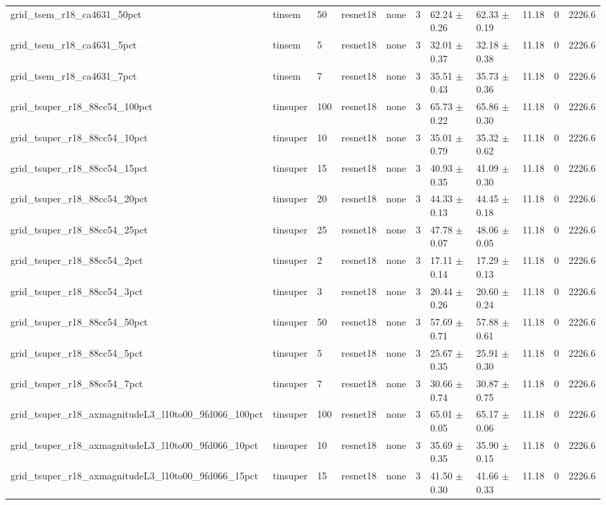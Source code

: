 \begin{tabular}{lllllllllll}
grid_tsem_r18_ca4631_50pct & tinsem & 50 & resnet18 & none & 3 & 62.24 $\pm$ 0.26 & 62.33 $\pm$ 0.19 & 11.18 & 0 & 2226.6 \\
grid_tsem_r18_ca4631_5pct & tinsem & 5 & resnet18 & none & 3 & 32.01 $\pm$ 0.37 & 32.18 $\pm$ 0.38 & 11.18 & 0 & 2226.6 \\
grid_tsem_r18_ca4631_7pct & tinsem & 7 & resnet18 & none & 3 & 35.51 $\pm$ 0.43 & 35.73 $\pm$ 0.36 & 11.18 & 0 & 2226.6 \\
grid_tsuper_r18_88cc54_100pct & tinsuper & 100 & resnet18 & none & 3 & 65.73 $\pm$ 0.22 & 65.86 $\pm$ 0.30 & 11.18 & 0 & 2226.6 \\
grid_tsuper_r18_88cc54_10pct & tinsuper & 10 & resnet18 & none & 3 & 35.01 $\pm$ 0.79 & 35.32 $\pm$ 0.62 & 11.18 & 0 & 2226.6 \\
grid_tsuper_r18_88cc54_15pct & tinsuper & 15 & resnet18 & none & 3 & 40.93 $\pm$ 0.35 & 41.09 $\pm$ 0.30 & 11.18 & 0 & 2226.6 \\
grid_tsuper_r18_88cc54_20pct & tinsuper & 20 & resnet18 & none & 3 & 44.33 $\pm$ 0.13 & 44.45 $\pm$ 0.18 & 11.18 & 0 & 2226.6 \\
grid_tsuper_r18_88cc54_25pct & tinsuper & 25 & resnet18 & none & 3 & 47.78 $\pm$ 0.07 & 48.06 $\pm$ 0.05 & 11.18 & 0 & 2226.6 \\
grid_tsuper_r18_88cc54_2pct & tinsuper & 2 & resnet18 & none & 3 & 17.11 $\pm$ 0.14 & 17.29 $\pm$ 0.13 & 11.18 & 0 & 2226.6 \\
grid_tsuper_r18_88cc54_3pct & tinsuper & 3 & resnet18 & none & 3 & 20.44 $\pm$ 0.26 & 20.60 $\pm$ 0.24 & 11.18 & 0 & 2226.6 \\
grid_tsuper_r18_88cc54_50pct & tinsuper & 50 & resnet18 & none & 3 & 57.69 $\pm$ 0.71 & 57.88 $\pm$ 0.61 & 11.18 & 0 & 2226.6 \\
grid_tsuper_r18_88cc54_5pct & tinsuper & 5 & resnet18 & none & 3 & 25.67 $\pm$ 0.35 & 25.91 $\pm$ 0.30 & 11.18 & 0 & 2226.6 \\
grid_tsuper_r18_88cc54_7pct & tinsuper & 7 & resnet18 & none & 3 & 30.66 $\pm$ 0.74 & 30.87 $\pm$ 0.75 & 11.18 & 0 & 2226.6 \\
grid_tsuper_r18_axmagnitudeL3_l10to00_9fd066_100pct & tinsuper & 100 & resnet18 & none & 3 & 65.01 $\pm$ 0.05 & 65.17 $\pm$ 0.06 & 11.18 & 0 & 2226.6 \\
grid_tsuper_r18_axmagnitudeL3_l10to00_9fd066_10pct & tinsuper & 10 & resnet18 & none & 3 & 35.69 $\pm$ 0.35 & 35.90 $\pm$ 0.15 & 11.18 & 0 & 2226.6 \\
grid_tsuper_r18_axmagnitudeL3_l10to00_9fd066_15pct & tinsuper & 15 & resnet18 & none & 3 & 41.50 $\pm$ 0.30 & 41.66 $\pm$ 0.33 & 11.18 & 0 & 2226.6 \\

\end{tabular}
